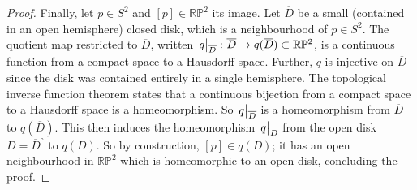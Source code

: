 \begin{example}
\begin{proof}
		Finally, let \( p \in S^2 \) and \( [p] \in \mathbb R \mathbb P^2 \) its image.
		Let \( \overline D \) be a small (contained in an open hemisphere) closed disk, which is a neighbourhood of \( p \in S^2 \).
		The quotient map restricted to \( \overline D \), written \( \eval{q}_{\overline D} \colon \overline D \to q(\overline D) \subset \mathbb R \mathbb P^2 \), is a continuous function from a compact space to a Hausdorff space.
		Further, \( q \) is injective on \( \overline D \) since the disk was contained entirely in a single hemisphere.
		The topological inverse function theorem states that a continuous bijection from a compact space to a Hausdorff space is a homeomorphism.
		So \( \eval{q}_{\overline D} \) is a homeomorphism from \( \overline D \) to \( q(\overline D) \).
		This then induces the homeomorphism \( \eval{q}_{D} \) from the open disk \( D = {\overline D}^\circ \) to \( q(D) \).
		So by construction, \( [p] \in q(D) \); it has an open neighbourhood in \( \mathbb R \mathbb P^2 \) which is homeomorphic to an open disk, concluding the proof.
	\end{proof}
\end{example}
